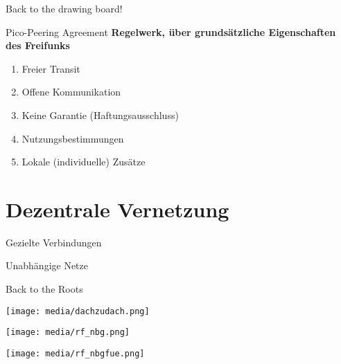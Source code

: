 \documentclass{beamer}
\begin{document}
	\begin{frame}[standout]
		Back to the drawing board!
	\end{frame}

	\begin{frame}{Pico-Peering Agreement}
		\textbf{Regelwerk, über grundsätzliche Eigenschaften des Freifunks}

		\begin{enumerate}
			\item Freier Transit
			\item Offene Kommunikation
			\item Keine Garantie (Haftungsausschluss)
			\item Nutzungsbestimmungen
			\item Lokale (individuelle) Zusätze
		\end{enumerate}
	\end{frame}

	\section{Dezentrale Vernetzung}
	\begin{frame}{Gezielte Verbindungen}
	\end{frame}
	\begin{frame}{Unabhängige Netze}
	\end{frame}
	\begin{frame}{Back to the Roots}
	\end{frame}

	\begin{frame}
		\texttt{[image: media/dachzudach.png]}
	\end{frame}
	\begin{frame}
		\texttt{[image: media/rf\_nbg.png]}
	\end{frame}
	\begin{frame}
		\texttt{[image: media/rf\_nbgfue.png]}
	\end{frame}
\end{document}
